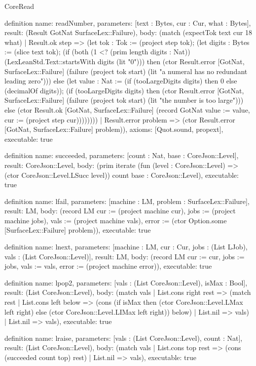 \begin{lexlean}{CoreRead}
\begin{semanticmodule}
definition{
  name: readNumber,
  parameters: [text : Bytes, cur : Cur, what : Bytes],
  result: (Result GotNat SurfaceLex::Failure),
  body: (match (expectTok text cur 18 what)
    | Result.ok step => (let tok : Tok := (project step tok); (let digits : Bytes := (slice text tok); (if (both (1 <? (prim length digits : Nat)) (LexLeanStd.Text::startsWith digits (lit "0"))) then (ctor Result.error [GotNat, SurfaceLex::Failure] (failure (project tok start) (lit "a numeral has no redundant leading zero"))) else (let value : Nat := (if (tooLargeDigits digits) then 0 else (decimalOf digits)); (if (tooLargeDigits digits) then (ctor Result.error [GotNat, SurfaceLex::Failure] (failure (project tok start) (lit "the number is too large"))) else (ctor Result.ok [GotNat, SurfaceLex::Failure] (record GotNat {value := value, cur := (project step cur)})))))))
    | Result.error problem => (ctor Result.error [GotNat, SurfaceLex::Failure] problem)),
  axioms: [Quot.sound, propext],
  executable: true
}

definition{
  name: succeeded,
  parameters: [count : Nat, base : CoreJson::Level],
  result: CoreJson::Level,
  body: (prim iterate (fun (level : CoreJson::Level) => (ctor CoreJson::Level.LSucc level)) count base : CoreJson::Level),
  executable: true
}

definition{
  name: lfail,
  parameters: [machine : LM, problem : SurfaceLex::Failure],
  result: LM,
  body: (record LM {cur := (project machine cur), jobs := (project machine jobs), vals := (project machine vals), error := (ctor Option.some [SurfaceLex::Failure] problem)}),
  executable: true
}

definition{
  name: lnext,
  parameters: [machine : LM, cur : Cur, jobs : (List LJob), vals : (List CoreJson::Level)],
  result: LM,
  body: (record LM {cur := cur, jobs := jobs, vals := vals, error := (project machine error)}),
  executable: true
}

definition{
  name: lpop2,
  parameters: [vals : (List CoreJson::Level), isMax : Bool],
  result: (List CoreJson::Level),
  body: (match vals
    | List.cons right rest => (match rest
      | List.cons left below => (cons (if isMax then (ctor CoreJson::Level.LMax left right) else (ctor CoreJson::Level.LIMax left right)) below)
      | List.nil => vals)
    | List.nil => vals),
  executable: true
}

definition{
  name: lraise,
  parameters: [vals : (List CoreJson::Level), count : Nat],
  result: (List CoreJson::Level),
  body: (match vals | List.cons top rest => (cons (succeeded count top) rest) | List.nil => vals),
  executable: true
}


\end{semanticmodule}
\end{lexlean}
